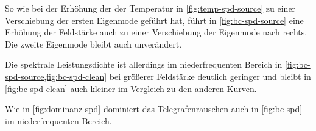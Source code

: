 \documentclass[main.tex]{subfiles}
\begin{document}
So wie bei der Erhöhung der der Temperatur in \cref{fig:temp-spd-source} zu einer Verschiebung der ersten Eigenmode geführt hat, führt in  \cref{fig:bc-spd-source} eine Erhöhung der Feldstärke auch zu einer Verschiebung der Eigenmode nach rechts. Die zweite Eigenmode bleibt auch unverändert.

Die spektrale Leistungsdichte ist allerdings im niederfrequenten Bereich in \cref{fig:bc-spd-source,fig:bc-spd-clean} bei größerer Feldstärke deutlich geringer und bleibt in \cref{fig:bc-spd-clean} auch kleiner im Vergleich zu den anderen Kurven.

Wie in \cref{fig:dominanz-spd} dominiert das Telegrafenrauschen auch in \cref{fig:bc-spd} im niederfrequenten Bereich.

\begin{figure}[H]
    \centering

\end{figure}
\end{document}
